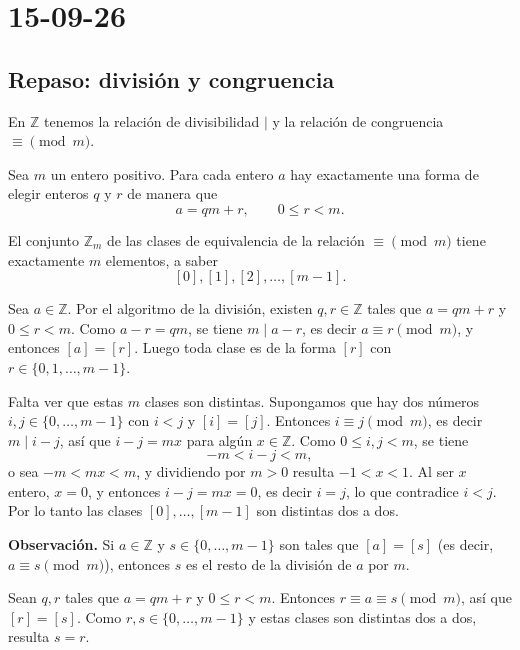 \chapter{15-09-26}
\section{Repaso: división y congruencia}

En $\mathbb{Z}$ tenemos la relación de divisibilidad $\mid$ y la
relación de congruencia $\equiv \pmod m$.

\begin{proposicion}[{title={Proposición: algoritmo de la división}}]
Sea $m$ un entero positivo. Para cada entero $a$ hay exactamente una
forma de elegir enteros $q$ y $r$ de manera que
\[
a = qm+r, \qquad 0 \le r < m.
\]
\end{proposicion}

\begin{proposicion}
El conjunto $\mathbb{Z}_m$ de las clases de equivalencia de la relación
$\equiv \pmod m$ tiene exactamente $m$ elementos, a saber
\[
[0],[1],[2],\dots,[m-1].
\]
\end{proposicion}

\begin{demostracion}
Sea $a \in \mathbb{Z}$. Por el algoritmo de la división, existen
$q,r\in\mathbb{Z}$ tales que $a=qm+r$ y $0\le r<m$. Como $a-r=qm$,
se tiene $m \mid a-r$, es decir $a \equiv r \pmod m$, y entonces
$[a]=[r]$. Luego toda clase es de la forma $[r]$ con
$r\in\{0,1,\dots,m-1\}$.

Falta ver que estas $m$ clases son distintas. Supongamos que hay dos
números $i,j\in\{0,\dots,m-1\}$ con $i<j$ y $[i]=[j]$. Entonces
$i\equiv j \pmod m$, es decir $m \mid i-j$, así que $i-j=mx$ para
algún $x\in\mathbb{Z}$. Como $0\le i,j<m$, se tiene
\[
-m < i-j < m,
\]
o sea $-m<mx<m$, y dividiendo por $m>0$ resulta $-1<x<1$. Al ser $x$
entero, $x=0$, y entonces $i-j=mx=0$, es decir $i=j$, lo que
contradice $i<j$. Por lo tanto las clases $[0],\dots,[m-1]$ son
distintas dos a dos.
\end{demostracion}

\begin{nota}
\textbf{Observación.} Si $a\in\mathbb{Z}$ y $s\in\{0,\dots,m-1\}$ son
tales que $[a]=[s]$ (es decir, $a\equiv s \pmod m$), entonces $s$ es el
resto de la división de $a$ por $m$.
\end{nota}

\begin{demostracion}
Sean $q,r$ tales que $a=qm+r$ y $0\le r<m$. Entonces
$r\equiv a\equiv s \pmod m$, así que $[r]=[s]$. Como $r,s\in
\{0,\dots,m-1\}$ y estas clases son distintas dos a dos, resulta
$s=r$.
\end{demostracion}

